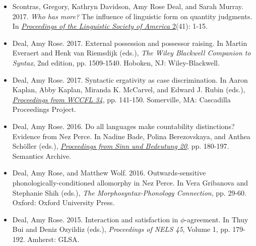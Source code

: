 \documentclass[12pt]{article}
\begin{document}
\begin{itemize}[labelsep=.5cm,leftmargin=0cm,itemindent=0cm]
\item \new Scontras, Gregory, Kathryn Davidson, Amy Rose Deal, and Sarah Murray. 2017. \emph{Who has more?} The influence of linguistic form on quantity judgments. In \href{https://journals.linguisticsociety.org/proceedings/index.php/PLSA/issue/view/159}{\emph{Proceedings of the Linguistic Society of America} 2}(41): 1-15.



  
  \item Deal, Amy Rose. 2017. External possession and possessor raising. In Martin Everaert and Henk van Riemsdijk (eds.), \textit{The Wiley Blackwell Companion to Syntax}, 2nd edition, pp. 1509-1540. Hoboken, NJ: Wiley-Blackwell. 
  
  \item   Deal, Amy Rose. 2017. Syntactic ergativity as case discrimination. In Aaron Kaplan, Abby Kaplan, Miranda K. McCarvel, and Edward J. Rubin (eds.), \href{http://www.lingref.com/cpp/wccfl/34/index.html}{\emph{Proceedings from WCCFL 34}}, pp. 141-150. Somerville, MA:  Cascadilla Proceedings Project.




  \item   Deal, Amy Rose. 2016. Do all languages make countability distinctions? Evidence from Nez Perce. In Nadine Bade, Polina Berezovskaya, and Anthea Sch\"oller (eds.), \href{https://ojs.ub.uni-konstanz.de/sub/index.php/sub/issue/view/7}{\emph{Proceedings from Sinn und Bedeutung 20}}, pp. 180-197. Semantics Archive. 



  \item Deal, Amy Rose, and Matthew Wolf. 2016. Outwards-sensitive phonologically-conditioned allomorphy in Nez Perce.  In Vera Gribanova and Stephanie Shih (eds.), \textit{The Morphosyntax-Phonology Connection}, pp. 29-60. Oxford: Oxford University Press.  

  \item   Deal, Amy Rose. 2015. Interaction and satisfaction in $\phi$-agreement. In Thuy Bui and Deniz Ozyildiz (eds.), \textit{Proceedings of NELS 45}, Volume 1, pp. 179-192. Amherst: GLSA. 


\end{itemize}
\end{document}

